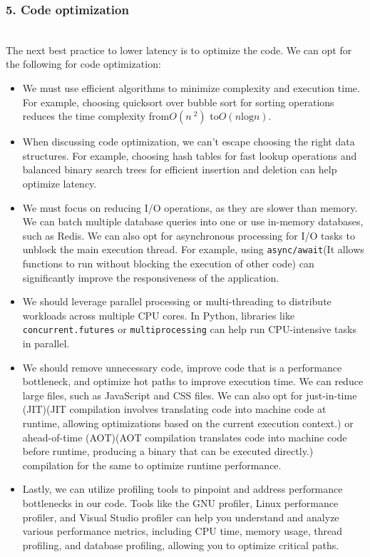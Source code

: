 \subsubsection{5. Code optimization}\label{1khr1nPPGL7UecCBEp-wG}
\\
The next best practice to lower latency is to optimize the code. We can opt for the following for code optimization:

\begin{itemize}
\item
\protect{}\label{NAq3k-yWTKUe3FBiNP1Kg}
We must use efficient algorithms to minimize complexity and execution time. For example, choosing quicksort over bubble sort for sorting operations reduces the time complexity from\protect{}\label{katex_inline_OspnZ1D7kOU1Skengqnfw}{{{\(O (n\ ^2)\)}}} to\protect{}\label{katex_inline_x5x-rlti45NypHyseJr1V}{{{\(O(n\text{log} n)\)}}}.
\item
\protect{}\label{WEtMLL4e9oL_SRLD9rsZV}
When discussing code optimization, we can't escape choosing the right data structures. For example, choosing hash tables for fast lookup operations and balanced binary search trees for efficient insertion and deletion can help optimize latency.
\item
\protect{}\label{ZzYjdPZfqMUclZuHVF-TT}
We must focus on reducing I/O operations, as they are slower than memory. We can batch multiple database queries into one or use in-memory databases, such as Redis. We can also opt for asynchronous processing for I/O tasks to unblock the main execution thread. For example, using \texttt{async/await}(It allows functions to run without blocking the execution of other code) can significantly improve the responsiveness of the application.
\item
\protect{}\label{yw7UcMyvV1S9mzxuWOwkB}
We should leverage parallel processing or multi-threading to distribute workloads across multiple CPU cores. In Python, libraries like \texttt{concurrent.futures} or \texttt{multiprocessing} can help run CPU-intensive tasks in parallel.
\item
\protect{}\label{qKP73HtGziIJ7qij8Namc}
We should remove unnecessary code, improve code that is a performance bottleneck, and optimize hot paths to improve execution time. We can reduce large files, such as JavaScript and CSS files. We can also opt for just-in-time (JIT)(JIT compilation involves translating code into machine code at runtime, allowing optimizations based on the current execution context.) or ahead-of-time (AOT)(AOT compilation translates code into machine code before runtime, producing a binary that can be executed directly.) compilation for the same to optimize runtime performance.
\item
\protect{}\label{hzNnFfWGx8h-w0F_oXRR8}
Lastly, we can utilize profiling tools to pinpoint and address performance bottlenecks in our code. Tools like the GNU profiler, Linux performance profiler, and Visual Studio profiler can help you understand and analyze various performance metrics, including CPU time, memory usage, thread profiling, and database profiling, allowing you to optimize critical paths.
\end{itemize}

